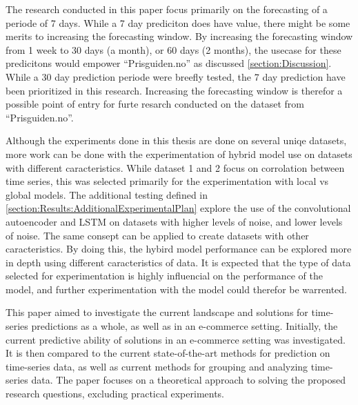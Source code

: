 The research conducted in this paper focus primarily on the forecasting of a periode of 7 days.
While a 7 day prediciton does have value,
there might be some merits to increasing the forecasting window.
By increasing the forecasting window from 1 week to 30 days (a month), or 60 days (2 months),
the usecase for these predicitons would empower ``Prisguiden.no'' as discussed \cref{section:Discussion}.
While a 30 day prediction periode were breefly tested,
the 7 day prediction have been prioritized in this research.
Increasing the forecasting window is therefor a possible point of entry for furte resarch conducted on the
dataset from ``Prisguiden.no''.


Although the experiments done in this thesis are done on several uniqe datasets,
more work can be done with the experimentation of hybrid model use on datasets with different caracteristics.
While dataset 1 and 2 focus on corrolation between time series, this was selected primarily for the experimentation with local vs global models.
The additional testing defined in \cref{section:Results:AdditionalExperimentalPlan} explore the use of the convolutional autoencoder and LSTM
on datasets with higher levels of noise, and lower levels of noise.
The same consept can be applied to create datasets with other caracteristics.
By doing this, the hybird model performance can be explored more in depth using different caracteristics of data.
It is expected that the type of data selected for experimentation is highly influencial on the performance of the model,
and further experimentation with the model could therefor be warrented.




\iffalse
This paper aimed to investigate the current landscape and solutions for time-series predictions as a whole,
as well as in an e-commerce setting.
Initially, the current predictive ability of solutions in an e-commerce setting was investigated.
It is then compared to the current state-of-the-art methods for prediction on time-series data,
as well as current methods for grouping and analyzing time-series data.
The paper focuses on a theoretical approach to solving the proposed research questions,
excluding practical experiments.

